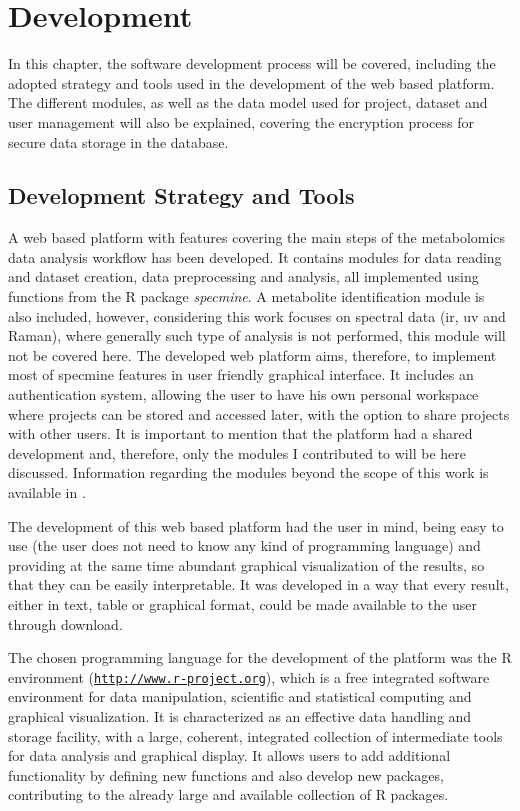 
\chapter{Development} \label{development}

In this chapter, the software development process will be covered, including the adopted strategy and tools used in the development of the web based platform. The different modules, as well as the data model used for project, dataset and user management will also be explained, covering the encryption process for secure data storage in the database.


\section{Development Strategy and Tools}

A web based platform with features covering the main steps of the metabolomics data analysis workflow has been developed. It contains modules for data reading and dataset creation, data preprocessing and analysis, all implemented using functions from the R package \textit{specmine}. A metabolite identification module is also included, however, considering this work focuses on spectral data (\gls{ir}, \gls{uv} and Raman), where generally such type of analysis is not performed, this module will not be covered here. The developed web platform aims, therefore, to implement most of specmine features in user friendly graphical interface. It includes an authentication system, allowing the user to have his own personal workspace where projects can be stored and accessed later, with the option to share projects with other users. It is important to mention that the platform had a shared development and, therefore, only the modules I contributed to will be here discussed. Information regarding the modules beyond the scope of this work is available in \cite{sara}.

The development of this web based platform had the user in mind, being easy to use (the user does not need to know any kind of programming language) and providing at the same time abundant graphical visualization of the results, so that they can be easily interpretable. It was developed in a way that every result, either in text, table or graphical format, could be made available to the user through download. 

The chosen programming language for the development of the platform was the R environment (\href{http://www.r-project.org}{\nolinkurl{http://www.r-project.org}}), which is a free integrated software environment for data manipulation, scientific and statistical computing and graphical visualization. It is characterized as an effective data handling and storage facility, with a large, coherent, integrated collection of intermediate tools for data analysis and graphical display. It allows users to add additional functionality by defining new functions and also develop new packages, contributing to the already large and available collection of R packages. 

